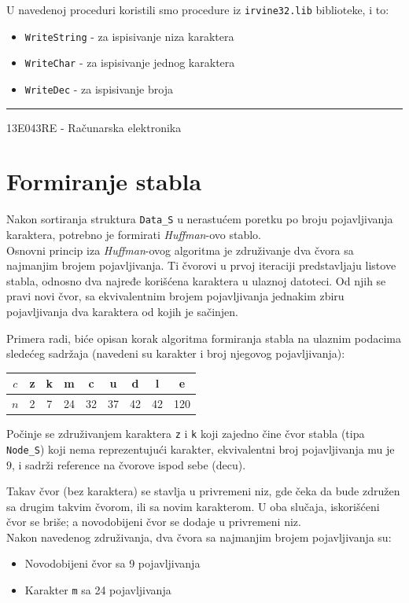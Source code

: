 \documentclass[a4paper, 12pt]{article}
\newcommand{\btmline}{
\vfill
\rule{0.9\textwidth}{0.4mm}
\begin{center}
13E043RE - Računarska elektronika
\end{center}}
\newcommand{\Huff}{\emph{Huffman}}
\begin{document}
U navedenoj proceduri koristili smo procedure iz \verb|irvine32.lib| biblioteke, i to: 
\begin{itemize}
\setlength\itemsep{0.1em}
\item \verb|WriteString| - za ispisivanje niza karaktera
\item \verb|WriteChar| - za ispisivanje jednog karaktera
\item \verb|WriteDec| - za ispisivanje broja
\end{itemize}

\btmline\newpage

\section*{Formiranje stabla}
Nakon sortiranja struktura \verb|Data_S| u nerastućem poretku po broju pojavljivanja karaktera, potrebno je formirati \emph{Huffman}-ovo stablo. \\
Osnovni princip iza \Huff-ovog algoritma je združivanje dva čvora sa najmanjim brojem pojavljivanja. Ti čvorovi u prvoj iteraciji predstavljaju listove stabla, odnosno dva najređe korišćena karaktera u ulaznoj datoteci. Od njih se pravi novi čvor, sa ekvivalentnim brojem pojavljivanja jednakim zbiru pojavljivanja dva karaktera od kojih je sačinjen.

Primera radi, biće opisan korak algoritma formiranja stabla na ulaznim podacima sledećeg sadržaja (navedeni su karakter i broj njegovog pojavljivanja):
\begin{table}[ht]
	\centering
	\begin{tabular}{| c ||  c  c  c  c  c  c  c  c |}
		\hline
		$c$ & z & k & m & c & u & d & l & e \\ \hline
		$n$ & 2 & 7 & 24 & 32 & 37 & 42 & 42 & 120 \\ \hline
	\end{tabular}
\end{table}

Počinje se združivanjem karaktera \verb|z| i \verb|k| koji zajedno čine čvor stabla (tipa \verb|Node_S|) koji nema reprezentujući karakter, ekvivalentni broj pojavljivanja mu je $9$, i sadrži reference na čvorove ispod sebe (decu). 

Takav čvor (bez karaktera) se stavlja u privremeni niz, gde čeka da bude združen sa drugim takvim čvorom, ili sa novim karakterom. U oba slučaja, iskorišćeni čvor se briše; a novodobijeni čvor se dodaje u privremeni niz. \\
Nakon navedenog združivanja, dva čvora sa najmanjim brojem pojavljivanja su:
\begin{itemize}
	\item Novodobijeni čvor sa 9 pojavljivanja
	\item Karakter \verb|m| sa 24 pojavljivanja
\end{itemize}
\end{document}
